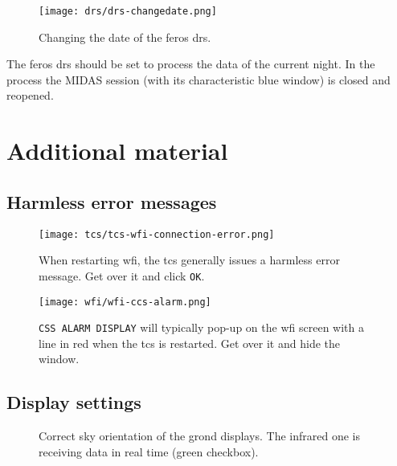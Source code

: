 \documentclass[11pt,fleqn]{book}
\begin{document}
\begin{figure}[ht!]
\centering
\texttt{[image: drs/drs-changedate.png]}
\caption{Changing the date of the \gls{feros} \gls{drs}.}
\label{fig:drsswitch}
\end{figure}
The \gls{feros} \gls{drs} should be set to process the data of the 
current night.  In the process the MIDAS session (with its characteristic
blue window) is closed and reopened.  

\section{Additional material}
\subsection{Harmless error messages}
\begin{figure}[ht!]
\centering
\texttt{[image: tcs/tcs-wfi-connection-error.png]}
\caption[Harmless error message of the TCS during WFI restart]{When restarting \gls{wfi}, the \gls{tcs} generally issues a harmless
error message.  Get over it and click \texttt{OK}.}
\label{fig:wfistarterror}
\end{figure}

\begin{figure}[ht!]
\centering
\texttt{[image: wfi/wfi-ccs-alarm.png]}
\caption[Harmless alarm display on WFI during TCS restart]{\texttt{CSS ALARM DISPLAY} will typically pop-up on the \gls{wfi}
screen with a line in red when the \gls{tcs} is restarted.  Get over it and
hide the window.}
\label{fig:wfialarm}
\end{figure}

\subsection{Display settings}
\begin{figure}[ht!]
\null\hfil
{}%
\hfil
{}
\hfil\null
\caption[Correct sky orientation of the GROND displays]{Correct sky orientation of the \gls{grond} displays. The infrared one
is receiving data in real time (green checkbox).}
\end{figure}

\end{document}
